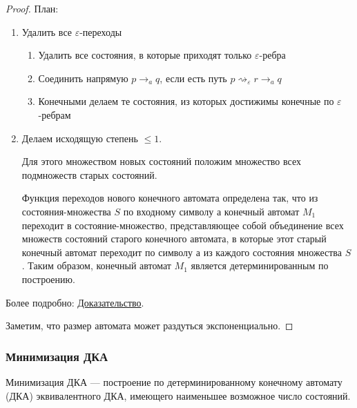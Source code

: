 \documentclass{article}
\begin{document}
\begin{proof}
	План:
	\begin{enumerate}
		\item Удалить все $\varepsilon$-переходы
		\begin{enumerate}[a]
			\item Удалить все состояния, в которые приходят только $\varepsilon$-ребра
			\item Соединить напрямую $p \rightarrow_a q$, если есть путь $p \rightsquigarrow_\varepsilon r \rightarrow_a q$
			\item Конечными делаем те состояния, из которых достижимы конечные по $\varepsilon$-ребрам
		\end{enumerate}
		\item Делаем исходящую степень $\leq 1$.
		
		Для этого множеством новых состояний положим множество всех подмножеств старых состояний. 
		
		Функция переходов нового конечного автомата определена так, что из состояния-множества $S$ по входному символу $а$ конечный автомат $M_1$ переходит в состояние-множество, представляющее собой объединение всех множеств состояний старого конечного автомата, в которые этот старый конечный автомат переходит по символу $а$ из каждого состояния множества $S$. Таким образом, конечный автомат $M_1$ является детерминированным по построению.
	\end{enumerate}

	Более подробно:  \href{http://mathhelpplanet.com/static.php?p=determinizatsiya-konechnykh-avtomatov}{Доказательство}.
	
	Заметим, что размер автомата может раздуться экспоненциально. 
\end{proof}

\subsubsection{Минимизация ДКА}

Минимизация ДКА — построение по детерминированному конечному автомату (ДКА) эквивалентного ДКА, имеющего наименьшее возможное число состояний. 

\end{document}
